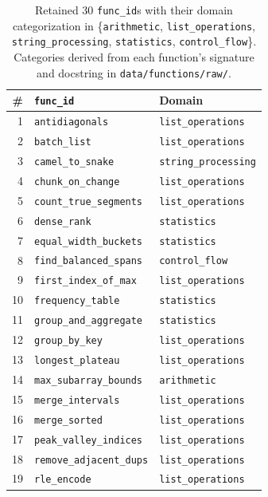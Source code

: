 \begin{table}[h]
\centering
\small
\caption{Retained 30 \texttt{func\_id}s with their domain categorization in
\{\texttt{arithmetic}, \texttt{list\_operations}, \texttt{string\_processing},
\texttt{statistics}, \texttt{control\_flow}\}. Categories derived from each
function's signature and docstring in \texttt{data/functions/raw/}.}
\label{tab:appendix-a-funcids}
\begin{tabular}{rll}
\toprule
\# & \texttt{func\_id} & Domain \\
\midrule
 1 & \texttt{antidiagonals}            & \texttt{list\_operations} \\
 2 & \texttt{batch\_list}              & \texttt{list\_operations} \\
 3 & \texttt{camel\_to\_snake}         & \texttt{string\_processing} \\
 4 & \texttt{chunk\_on\_change}        & \texttt{list\_operations} \\
 5 & \texttt{count\_true\_segments}    & \texttt{list\_operations} \\
 6 & \texttt{dense\_rank}              & \texttt{statistics} \\
 7 & \texttt{equal\_width\_buckets}    & \texttt{statistics} \\
 8 & \texttt{find\_balanced\_spans}    & \texttt{control\_flow} \\
 9 & \texttt{first\_index\_of\_max}    & \texttt{list\_operations} \\
10 & \texttt{frequency\_table}         & \texttt{statistics} \\
11 & \texttt{group\_and\_aggregate}    & \texttt{statistics} \\
12 & \texttt{group\_by\_key}           & \texttt{list\_operations} \\
13 & \texttt{longest\_plateau}         & \texttt{list\_operations} \\
14 & \texttt{max\_subarray\_bounds}    & \texttt{arithmetic} \\
15 & \texttt{merge\_intervals}         & \texttt{list\_operations} \\
16 & \texttt{merge\_sorted}            & \texttt{list\_operations} \\
17 & \texttt{peak\_valley\_indices}    & \texttt{list\_operations} \\
18 & \texttt{remove\_adjacent\_dups}   & \texttt{list\_operations} \\
19 & \texttt{rle\_encode}              & \texttt{list\_operations} \\

\end{tabular}
\end{table}
